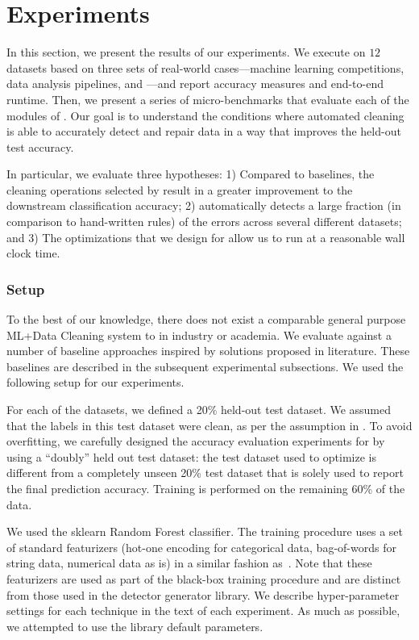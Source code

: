 \section{Experiments}\label{s:exp}
In this section, we present the results of our experiments.  We execute \sys on $12$ datasets based on three sets of real-world cases---machine learning competitions, data analysis pipelines, and \company---and report accuracy measures and end-to-end runtime.  Then, we present a series of micro-benchmarks that evaluate each of the modules of \sys.  Our goal is to understand the conditions where automated cleaning is able to accurately detect and repair data in a way that improves the held-out test accuracy. 

In particular, we evaluate three hypotheses: 1) Compared to baselines, the cleaning operations selected by \sys result in a greater improvement to the downstream classification accuracy; 2) \sys automatically detects a large fraction (in comparison to hand-written rules) of the errors across several different datasets; and 3) The optimizations that we design for \sys allow us to run at a reasonable wall clock time.

\subsubsection{Setup}

To the best of our knowledge, there does not exist a comparable general purpose ML+Data Cleaning system to \sys in industry or academia.  We evaluate \sys against a number of baseline approaches inspired by solutions proposed in literature.   These baselines are described in the subsequent experimental subsections.
We used the following setup for our experiments. 

 For each of the datasets, we defined a 20\% held-out test dataset. We assumed that the labels in this test dataset were clean, as per the assumption in \sys. To avoid overfitting, we carefully designed the accuracy evaluation experiments for \sys by using a ``doubly'' held out test dataset: the test dataset used to optimize \sys is different from a completely unseen 20\% test dataset that is solely used to report the final prediction accuracy.
Training is performed on the remaining 60\% of the data.

 We used the \textsf{sklearn} Random Forest classifier.  The training procedure uses a set of standard featurizers (hot-one encoding for categorical data, bag-of-words for string data, numerical data as is) in a similar fashion as~\cite{gokhale2014corleone}.  Note that these featurizers are used as part of the black-box training procedure and are distinct from those used in the detector generator library. 
We describe hyper-parameter settings for each technique in the text of each experiment.
As much as possible, we attempted to use the library default parameters.

